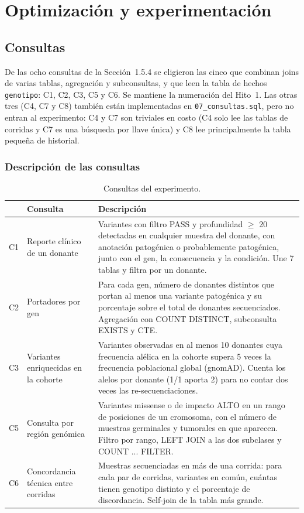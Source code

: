 \section{Optimización y experimentación}

\subsection{Consultas}\label{sec:consultas}

De las ocho consultas de la Sección~1.5.4 se eligieron las cinco que combinan joins de varias tablas, agregación
y subconsultas, y que leen la tabla de hechos \texttt{genotipo}: C1, C2, C3, C5 y C6. Se mantiene la numeración
del Hito~1. Las otras tres (C4, C7 y C8) también están implementadas en \texttt{07\_\allowbreak{}consultas.sql}, pero no entran
al experimento: C4 y C7 son triviales en costo (C4 solo lee las tablas de corridas y C7 es una búsqueda por llave
única) y C8 lee principalmente la tabla pequeña de historial.

\subsubsection{Descripción de las consultas}

\begin{table}[H]
\centering\small
\begin{tabular}{@{}>{\raggedright\arraybackslash}p{0.7cm}>{\raggedright\arraybackslash}p{3.2cm}>{\raggedright\arraybackslash}p{10.5cm}@{}}
\toprule
 & Consulta & Descripción \\
\midrule
C1 & Reporte clínico de un donante & Variantes con filtro PASS y profundidad $\geq$ 20 detectadas en cualquier muestra del donante, con anotación patogénica o probablemente patogénica, junto con el gen, la consecuencia y la condición. Une 7 tablas y filtra por un donante. \\
C2 & Portadores por gen & Para cada gen, número de donantes distintos que portan al menos una variante patogénica y su porcentaje sobre el total de donantes secuenciados. Agregación con COUNT DISTINCT, subconsulta EXISTS y CTE. \\
C3 & Variantes enriquecidas en la cohorte & Variantes observadas en al menos 10 donantes cuya frecuencia alélica en la cohorte supera 5 veces la frecuencia poblacional global (gnomAD). Cuenta los alelos por donante (1/1 aporta 2) para no contar dos veces las re-secuenciaciones. \\
C5 & Consulta por región genómica & Variantes missense o de impacto ALTO en un rango de posiciones de un cromosoma, con el número de muestras germinales y tumorales en que aparecen. Filtro por rango, LEFT JOIN a las dos subclases y COUNT ... FILTER. \\
C6 & Concordancia técnica entre corridas & Muestras secuenciadas en más de una corrida: para cada par de corridas, variantes en común, cuántas tienen genotipo distinto y el porcentaje de discordancia. Self-join de la tabla más grande. \\
\bottomrule
\end{tabular}
\caption{Consultas del experimento.}
\end{table}

